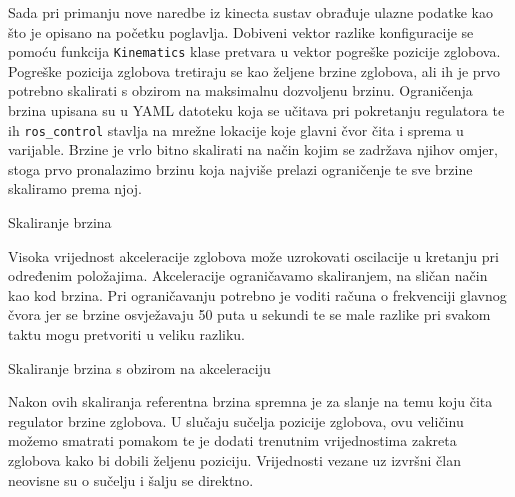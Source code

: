 \documentclass[times, utf8, diplomski, numeric]{fer}
\begin{document}
Sada pri primanju nove naredbe iz kinecta sustav obrađuje ulazne podatke kao što je opisano na početku poglavlja.
Dobiveni vektor razlike konfiguracije se pomoću funkcija \texttt{Kinematics} klase pretvara u vektor pogreške pozicije zglobova.
Pogreške pozicija zglobova tretiraju se kao željene brzine zglobova, ali ih je prvo potrebno skalirati s obzirom na maksimalnu dozvoljenu brzinu.
Ograničenja brzina upisana su u YAML datoteku koja se učitava pri pokretanju regulatora te ih \texttt{ros\_control} stavlja na mrežne lokacije koje glavni čvor čita i sprema u varijable.
Brzine je vrlo bitno skalirati na način kojim se zadržava njihov omjer, stoga prvo pronalazimo brzinu koja najviše prelazi ograničenje te sve brzine skaliramo prema njoj.
\begin{algorithm}[H]
\caption{Skaliranje brzina}
\begin{algorithmic}
\ENDIF
\ENDFOR
{}
\ENDFOR
\end{algorithmic}
\end{algorithm}

Visoka vrijednost akceleracije zglobova može uzrokovati oscilacije u kretanju pri određenim položajima. 
Akceleracije ograničavamo skaliranjem, na sličan način kao kod brzina.
Pri ograničavanju potrebno je voditi računa o frekvenciji glavnog čvora jer se brzine osvježavaju 50 puta u sekundi te se male razlike pri svakom taktu mogu pretvoriti u veliku razliku.
\begin{algorithm}[H]
\caption{Skaliranje brzina s obzirom na akceleraciju}
\begin{algorithmic}
\ENDIF
\ENDFOR
{}
\ENDFOR
\end{algorithmic}
\end{algorithm}

Nakon ovih skaliranja referentna brzina spremna je za slanje na temu koju čita regulator brzine zglobova.
U slučaju sučelja pozicije zglobova, ovu veličinu možemo smatrati pomakom te je dodati trenutnim vrijednostima zakreta zglobova kako bi dobili željenu poziciju.
Vrijednosti vezane uz izvršni član neovisne su o sučelju i šalju se direktno.
\end{document}
